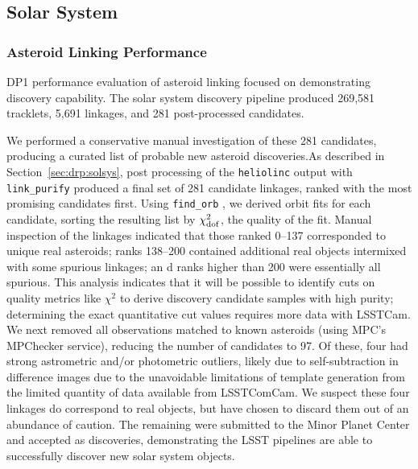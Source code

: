 \subsection{Solar System}
\label{sec:performance:solsys}

\subsubsection{Asteroid Linking Performance}

\gls{DP1} performance evaluation of asteroid linking focused on demonstrating discovery capability.
The solar system discovery \gls{pipeline} produced 269,581 tracklets, 5,691 linkages, and 281 post-processed candidates.

We performed a conservative manual investigation of these 281 candidates, producing a curated list of \nnewasteroiddiscoveries probable new asteroid discoveries.As described in Section~\ref{sec:drp:solsys}, post processing of the {\tt heliolinc} output with {\tt link\_purify} produced a final set of 281 candidate linkages, ranked with the most promising candidates first.
Using {\tt find\_orb} \citep{findorb}, we derived orbit fits for each candidate, sorting the resulting list by $\chi_{\rm dof}^2$, the quality of the fit.
Manual inspection of the linkages indicated that those ranked 0--137 corresponded to unique real asteroids; ranks 138--200 contained additional real objects intermixed with some spurious linkages; an d ranks higher than 200 were essentially all spurious.
This analysis indicates that it will be possible to identify cuts on quality metrics like $\chi^2$ to derive discovery candidate samples with high purity; determining the exact quantitative cut values requires more data with \gls{LSSTCam}.
We next removed all observations matched to known asteroids (using \gls{MPC}'s MPChecker service), reducing the number of candidates to 97.
Of these, four had strong astrometric and/or photometric outliers, likely due to self-subtraction in difference images due to the unavoidable limitations of template generation from the limited quantity of data available from  \gls{LSSTComCam}.
We suspect these four linkages do correspond to real objects, but have chosen to discard them out of an abundance of caution.
The remaining \nnewasteroiddiscoveries were submitted to the Minor Planet Center and accepted as  discoveries, demonstrating the \gls{LSST} pipelines are able to successfully discover new solar system objects.


